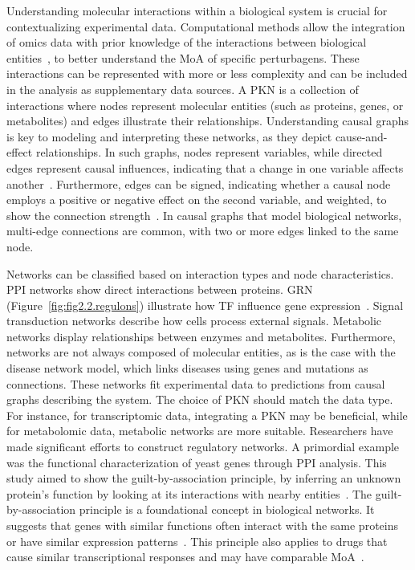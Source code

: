 Understanding molecular interactions within a biological system is crucial for contextualizing experimental data. 
Computational methods allow the integration of omics data with prior knowledge of the interactions between biological entities~\cite{RN38}, to better understand the \gls{MoA} of specific perturbagens.  
These interactions can be represented with more or less complexity and can be included in the analysis as supplementary data sources. 
A \gls{PKN} is a collection of interactions where nodes represent molecular entities (such as proteins, genes, or metabolites) and edges illustrate their relationships. 
Understanding causal graphs is key to modeling and interpreting these networks, as they depict cause-and-effect relationships. 
In such graphs, nodes represent variables, while directed edges represent causal influences, indicating that a change in one variable affects another~\cite{RN37}. 
Furthermore, edges can be signed, indicating whether a causal node employs a positive or negative effect on the second variable, and weighted, to show the connection strength~\cite{RN37}. 
In causal graphs that model biological networks, multi-edge connections are common, with two or more edges linked to the same node. 

Networks can be classified based on interaction types and node characteristics. \gls{PPI} networks show direct interactions between proteins. 
\gls{GRN} (Figure~\ref{fig:fig2.2.regulons}) illustrate how \gls{TF} influence gene expression~\cite{RN145}. 
Signal transduction networks describe how cells process external signals. Metabolic networks display relationships between enzymes and metabolites. 
Furthermore, networks are not always composed of molecular entities, as is the case with the disease network model, which links diseases using genes and mutations as connections. 
These networks fit experimental data to predictions from causal graphs describing the system. The choice of \gls{PKN} should match the data type. 
For instance, for transcriptomic data, integrating a \gls{PKN} may be beneficial, while for metabolomic data, metabolic networks are more suitable. 
Researchers have made significant efforts to construct regulatory networks. A primordial example was the functional characterization of yeast genes through \gls{PPI} analysis. This study aimed to show the guilt-by-association principle, by inferring an unknown protein's function by looking at its interactions with nearby entities~\cite{RN37, RN103}. 
The guilt-by-association principle is a foundational concept in biological networks. It suggests that genes with similar functions often interact with the same proteins or have similar expression patterns~\cite{RN133}. 
This principle also applies to drugs that cause similar transcriptional responses and may have comparable \gls{MoA}~\cite{RN64}.

